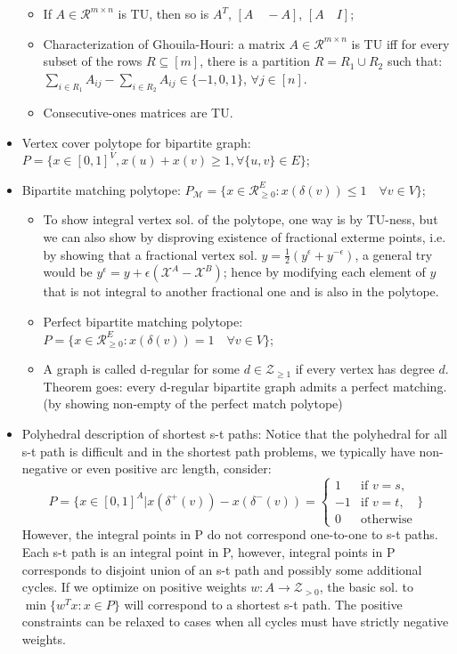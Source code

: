 \documentclass{article}
\begin{document}
\begin{itemize}
\begin{itemize}
\item If $A\in\mathcal{R}^{m\times n}$ is TU, then so is $A^T$, $[A\quad-A]$, $[A\quad I]$;
\item Characterization of Ghouila-Houri: a matrix $A\in\mathcal{R}^{m\times n}$ is TU iff for every subset of the rows $R\subseteq [m]$, there is a partition $R=R_1\cup R_2$ such that: $\underset{i\in R_1}{\sum}A_{ij}-\underset{i\in R_2}{\sum}A_{ij}\in \{-1,0,1\}$, $\forall j\in [n]$.
\item Consecutive-ones matrices are TU.
\end{itemize}
\item Vertex cover polytope for bipartite graph: $P=\{x\in [0,1]^V, x(u)+x(v)\geq 1, \forall \{u,v\}\in E\}$;
\item Bipartite matching polytope: $P_\mathcal{M}=\{x\in\mathcal{R}_{\geq 0}^E: x(\delta(v))\leq 1 \quad\forall v\in V\}$;
\begin{itemize}
\item To show integral vertex sol. of the polytope, one way is by TU-ness, but we can also show by disproving existence of fractional exterme points, i.e. by showing that a fractional vertex sol. $y=\frac{1}{2}(y^\epsilon + y^{-\epsilon})$, a general try would be $y^\epsilon=y+\epsilon(\mathcal{X}^A-\mathcal{X}^B)$; hence by modifying each element of $y$ that is not integral to another fractional one and is also in the polytope.
\item Perfect bipartite matching polytope: $P=\{x\in\mathcal{R}_{\geq 0}^E: x(\delta(v))= 1 \quad\forall v\in V\}$;
\item A graph is called d-regular for some $d\in\mathcal{Z}_{\geq 1}$ if every vertex has degree $d$. Theorem goes: every d-regular bipartite graph admits a perfect matching. (by showing non-empty of the perfect match polytope)
\end{itemize}
\item Polyhedral description of shortest s-t paths: Notice that the polyhedral for all s-t path is difficult and in the shortest path problems, we typically have non-negative or even positive arc length, consider:
\begin{equation*}
P=\Bigg\{x\in [0,1]^A\bigg|x(\delta^+(v))-x(\delta^-(v))=
\begin{cases}
1 & \mbox{if }  v=s,\\
-1 &\mbox{if } v=t,\\
0 & \mbox{otherwise}
\end{cases}\Bigg\}
\end{equation*}
However, the integral points in P do not correspond one-to-one to s-t paths. Each s-t path is an integral point in P, however, integral points in P corresponds to disjoint union of an s-t path and possibly some additional cycles. If we optimize on positive weights $w:A\rightarrow\mathcal{Z}_{>0}$, the basic sol. to $\min\{w^Tx:x\in P\}$ will correspond to a shortest s-t path. The positive constraints can be relaxed to cases when all cycles must have strictly negative weights.

\end{itemize}
\end{document}
